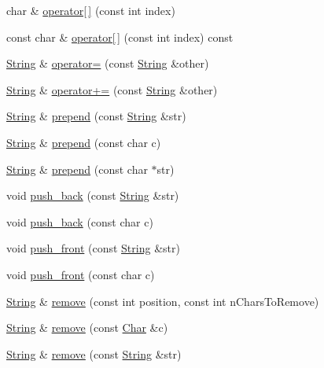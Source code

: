 \begin{DoxyCompactItemize}
char \& \hyperlink{classprism_1_1_string_a2aa545085262fc28c9199a5790bfbd0a}{operator\mbox{[}$\,$\mbox{]}} (const int index)
\item 
const char \& \hyperlink{classprism_1_1_string_ad519fe1a0696fe5c4b77808d605bc68e}{operator\mbox{[}$\,$\mbox{]}} (const int index) const 
\item 
\hyperlink{classprism_1_1_string}{String} \& \hyperlink{classprism_1_1_string_ad2c84ac36bccdb26c446d32a1615f321}{operator=} (const \hyperlink{classprism_1_1_string}{String} \&other)
\item 
\hyperlink{classprism_1_1_string}{String} \& \hyperlink{classprism_1_1_string_a8d509ab7982bc6176c58f5fbce1da15c}{operator+=} (const \hyperlink{classprism_1_1_string}{String} \&other)
\item 
\hyperlink{classprism_1_1_string}{String} \& \hyperlink{classprism_1_1_string_a0deb77daa45d88136d39b9960075cdb5}{prepend} (const \hyperlink{classprism_1_1_string}{String} \&str)
\item 
\hyperlink{classprism_1_1_string}{String} \& \hyperlink{classprism_1_1_string_a8f670c0ad0c7c00cdb89170f4b2275b3}{prepend} (const char c)
\item 
\hyperlink{classprism_1_1_string}{String} \& \hyperlink{classprism_1_1_string_a91f28e14e3febf379ff47a3bda12adab}{prepend} (const char $\ast$str)
\item 
void \hyperlink{classprism_1_1_string_a8e1459833ede719cd6b01ab5ce15d2e5}{push\+\_\+back} (const \hyperlink{classprism_1_1_string}{String} \&str)
\item 
void \hyperlink{classprism_1_1_string_a81b6a39be2a985ea02c46a4d1490755c}{push\+\_\+back} (const char c)
\item 
void \hyperlink{classprism_1_1_string_aadab394ea2370e2d23fcf932d373dcd3}{push\+\_\+front} (const \hyperlink{classprism_1_1_string}{String} \&str)
\item 
void \hyperlink{classprism_1_1_string_a5471ead67f8901cbed6bd43ef9f4a618}{push\+\_\+front} (const char c)
\item 
\hyperlink{classprism_1_1_string}{String} \& \hyperlink{classprism_1_1_string_a3ccec53675d61756c3beb1bbc43c981f}{remove} (const int position, const int n\+Chars\+To\+Remove)
\item 
\hyperlink{classprism_1_1_string}{String} \& \hyperlink{classprism_1_1_string_a7529b02c672f5effdd31bdaad3e8f0de}{remove} (const \hyperlink{classprism_1_1_char}{Char} \&c)
\item 
\hyperlink{classprism_1_1_string}{String} \& \hyperlink{classprism_1_1_string_a1d13f42ceb8d784e2379be1394bc4ea6}{remove} (const \hyperlink{classprism_1_1_string}{String} \&str)

\end{DoxyCompactItemize}
